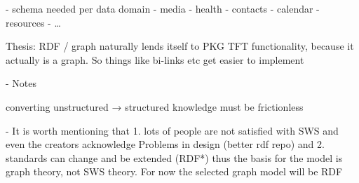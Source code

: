- schema needed per data domain
    - media
    - health
    - contacts
    - calendar
    - resources
    - …

Thesis: RDF / graph naturally lends itself to PKG TFT functionality, because it actually is a graph. So things like bi-links etc get easier to implement

- Notes
    
    converting unstructured → structured knowledge must be frictionless
    
    - It is worth mentioning that
        1.  lots of people are not satisfied with SWS and even the creators acknowledge Problems in design (better rdf repo) and 
        2.  standards can change and be extended (RDF*) thus the basis for the model is graph theory, not SWS theory. For now the selected graph model will be RDF